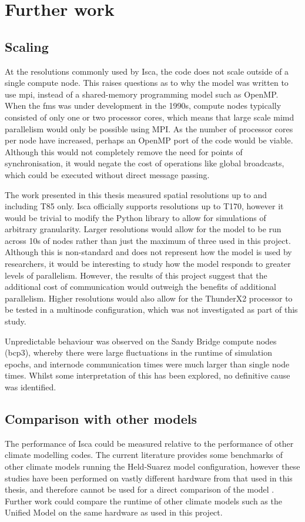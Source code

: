 \documentclass[a4paper,11pt]{report}
\begin{document}
\section{Further work}
\subsection{Scaling}
At the resolutions commonly used by Isca, the code does not scale outside of a single compute node. This raises questions as to why the model was written to use \gls{mpi}, instead of a shared-memory programming model such as OpenMP. When the \gls{fms} was under development in the 1990s, compute nodes typically consisted of only one or two processor cores, which means that large scale \gls{mimd} parallelism would only be possible using MPI. As the number of processor cores per node have increased, perhaps an OpenMP port of the code would be viable. Although this would not completely remove the need for points of synchronisation, it would negate the cost of operations like global broadcasts, which could be executed without direct message passing. 
\par
The work presented in this thesis measured spatial resolutions up to and including T85 only. Isca officially supports resolutions up to T170, however it would be trivial to modify the Python library to allow for simulations of arbitrary granularity. Larger resolutions would allow for the model to be run across 10s of nodes rather than just the maximum of three used in this project. Although this is non-standard and does not represent how the model is used by researchers, it would be interesting to study how the model responds to greater levels of parallelism. However, the results of this project suggest that the additional cost of communication would outweigh the benefits of additional parallelism. Higher resolutions would also allow for the ThunderX2 processor to be tested in a multinode configuration, which was not investigated as part of this study. 
\par
Unpredictable behaviour was observed on the Sandy Bridge compute nodes (\gls{bcp3}), whereby there were large fluctuations in the runtime of simulation epochs, and internode communication times were much larger than single node times. Whilst some interpretation of this has been explored, no definitive cause was identified.

\subsection{Comparison with other models}
The performance of Isca could be measured relative to the performance of other climate modelling codes. The current literature provides some benchmarks of other climate models running the Held-Suarez model configuration, however these studies have been performed on vastly different hardware from that used in this thesis, and therefore cannot be used for a direct comparison of the model \cite{schmidt2007benchmark}. Further work could compare the runtime of other climate models such as the Unified Model on the same hardware as used in this project.
\end{document}
